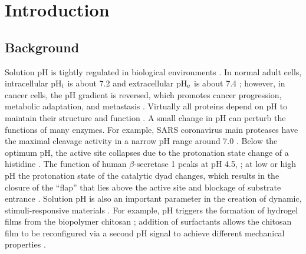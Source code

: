 \section{Introduction} %
\subsection{Background}
Solution pH is tightly regulated in biological environments \cite{Casey_Orlowski_2010_Nat.Rev.Mol.CellBiol.}. 
In normal adult cells, intracellular pH$_{\rm i}$ is about 7.2 and extracellular pH$_{\rm e}$ is about 7.4 \cite{Webb_Barber_2011_Nat.Rev.Cancer};
however, in cancer cells, the pH gradient is reversed,
which promotes cancer progression, metabolic adaptation, and metastasis
\cite{Webb_Barber_2011_Nat.Rev.Cancer,White_Barber_2017_J.CellSci.}. 
Virtually all proteins depend on pH to maintain their structure and function
\cite{Casey_Orlowski_2010_Nat.Rev.Mol.CellBiol.,Roos_Boron_1981_Physiol.Rev.}.
A small change in pH can perturb the functions of many enzymes.
For example, SARS coronavirus main proteases have the maximal
cleavage activity in a narrow pH range around 7.0 \cite{Tan_Hilgenfeld_2005_J.Mol.Biol.}. 
Below the optimum pH, the active site collapses
due to the protonation state change of a histidine \cite{Tan_Hilgenfeld_2005_J.Mol.Biol.,Verma_Shen_2020_J.Am.Chem.Soc.}. 
The function of human $\beta$-secretase 1 peaks at pH 4.5,
\cite{Shimizu_Nukina_2008_Mol.CellBiol.}; at low or high pH
the protonation state of the catalytic dyad changes, 
which results in the closure of the ``flap'' that lies above
the active site and blockage of 
substrate entrance \cite{Ellis_Shen_2015_J.Am.Chem.Soc.}.
Solution pH is also an important parameter in the creation of dynamic, stimuli-responsive materials \cite{Li_Payne_2019_Biofabrication}. 
For example, pH triggers the formation of hydrogel films
from the biopolymer chitosan
\cite{Morrow_Shen_2015_J.Am.Chem.Soc.}; 
addition of surfactants allows the chitosan film to be reconfigured via a second pH signal to achieve different mechanical properties \cite{Tsai_Shen_2018_Chem.Mater.}.

